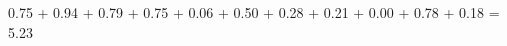 \documentclass[preview]{standalone}
\begin{document}
\begin{center}
0.75 + 0.94 + 0.79 + 0.75 + 0.06 + 0.50 + 0.28 + 0.21 + 0.00 + 0.78 + 0.18 = 5.23
\end{center}
\end{document}
